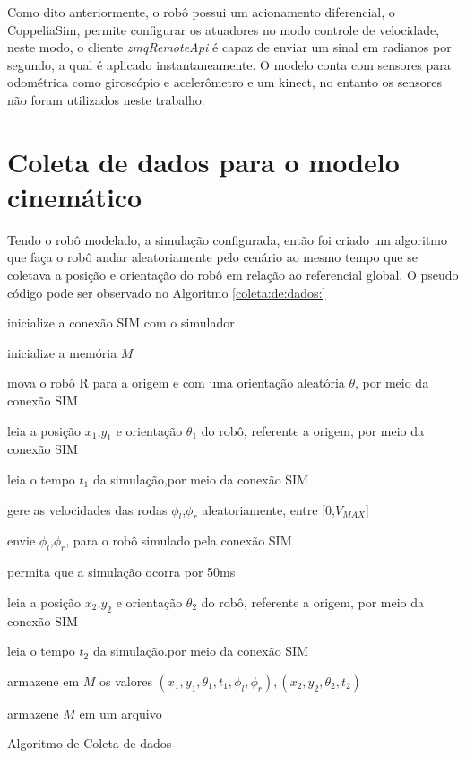 Como dito anteriormente, o robô possui um acionamento diferencial,
o CoppeliaSim, permite configurar os atuadores no modo controle de
velocidade, neste modo, o cliente \textit{zmqRemoteApi} é capaz de enviar
um sinal em radianos por segundo, a qual é aplicado instantaneamente.
O modelo conta com sensores para odométrica como giroscópio e acelerômetro
e um kinect, no entanto os sensores não foram utilizados neste trabalho.

\section{Coleta de dados para o modelo cinemático}
Tendo o robô modelado, a simulação configurada, então foi criado
um algoritmo que faça o robô andar aleatoriamente pelo cenário ao mesmo
tempo que se coletava a posição e orientação do robô em relação ao referencial
global. O pseudo código pode ser observado no Algoritmo \ref{coleta:de:dados:}

\begin{algorithm}[H]
    \label{coleta:de:dados:}
    
    
    inicialize a conexão SIM  com o simulador

    inicialize a memória $M$

    mova o robô R para a origem e com uma orientação aleatória $\theta$,
    por meio da conexão SIM

     {
        leia a posição $x_1$,$y_1$  e orientação $\theta_{1}$ do robô,
        referente a origem, por meio da conexão SIM
        
        leia o tempo $t_1$ da simulação,por meio da conexão SIM
        
        gere as velocidades das rodas $\phi_l$,$\phi_r$ aleatoriamente,
        entre [0,$V_{MAX}$]
        
        envie  $\phi_l$,$\phi_r$, para o robô simulado pela conexão SIM

        permita que a simulação ocorra por 50ms 

        leia a posição $x_2$,$y_2$  e orientação $\theta_{2}$ do robô,
        referente a origem, por meio da conexão SIM

        leia o tempo $t_2$ da simulação.por meio da conexão SIM

        
        armazene em $M$ os valores  $(x_1,y_1,\theta_{1},t_1,\phi_l,\phi_r),(x_2,y_2,\theta_{2},t_2)$
        
    }

    armazene $M$ em um arquivo
    
    \caption{Algoritmo de Coleta de dados}
    
\end{algorithm}

